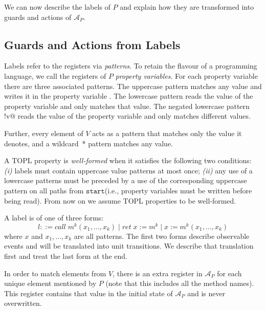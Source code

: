 \documentclass{article} %
\newcommand{\A}{\ensuremath{\mathcal{A}}}
\newcommand{\start}{\ensuremath{\mathtt{start}}\xspace}
\theoremstyle{definition}
\theoremstyle{remark}
\begin{document}
We can now describe the labels of $P$ and explain how they are transformed into guards and
actions of $\A_P$.

\subsection{Guards and Actions from Labels}

Labels refer to the registers via \emph{patterns}. To retain the
flavour of a programming language, we call the registers of $P$
\emph{property variables}.
%
For each property variable \Verb@v@ there are three associated patterns.
The uppercase pattern \Verb@V@ matches any value and writes it in the property variable \Verb@v@.
The lowercase pattern \Verb@v@ reads the value of the property variable \Verb@v@ and only matches that value.
The negated lowercase pattern \Verb@!v@ reads the value of the
property variable \Verb@v@ and only matches different values.

Further, every element of $V$ acts as a pattern that matches only the value it denotes,
and a wildcard~* pattern matches any value.

\smallskip
A TOPL property is \emph{well-formed} when it satisfies the following two conditions:
{\em (i)} labels must contain uppercase value patterns at most once; {\em (ii)}
any use of a lowercase patterns must be preceded by a use of the corresponding uppercase pattern on all paths from \start  (i.e., property variables must be written before being read).
From now on we assume TOPL properties to be well-formed.

A label is of one of three forms:
\[
  l ::=
  call\;m^k(x_1, \ldots, x_k) \mid
  ret\;x := m^k \mid
  x := m^k(x_1, \ldots, x_k)
\]
where $x$ and $x_1, \ldots, x_k$ are all patterns.
The first two forms describe observable events and will be translated
into unit transitions. We describe that translation first and treat
the last form at the end.

In order to match elements from $V$, there is an extra register in
$\A_P$ for each unique element mentioned by $P$ (note that this
includes all the method names). This register contains
that value in the initial state of $\A_P$ and is never overwritten.
\end{document}
